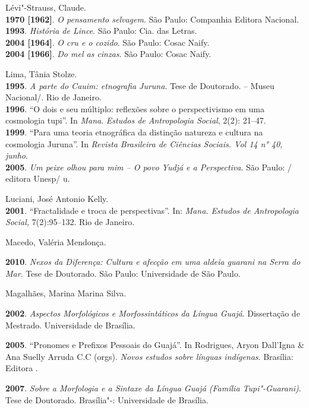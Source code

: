 \begin{Parskip}
Lévi"-Strauss, Claude.\\
\textbf{1970 {[}1962{]}}. \emph{O pensamento selvagem}. São Paulo:
Companhia Editora Nacional.\\
\textbf{1993}. \emph{História de Lince}. São Paulo: Cia. das Letras.\\
\textbf{2004 {[}1964{]}}. \emph{O cru e o cozido}. São Paulo: Cosac
Naify.\\
\textbf{2004 {[}1966{]}}. \emph{Do mel as cinzas}. São Paulo: Cosac
Naify.

Lima, Tânia Stolze.\\
\textbf{1995}. \emph{A parte do Cauim: etnografia Juruna}. Tese de
Doutorado.  -- Museu Nacional/. Rio de Janeiro.\\
\textbf{1996}. ``O dois e seu múltiplo: reflexões sobre o perspectivismo
em uma cosmologia tupi''. In \emph{Mana}. \emph{Estudos de Antropologia
Social}, 2(2): 21--47.\\
\textbf{1999}. ``Para uma teoria etnográfica da distinção natureza e
cultura na cosmologia Juruna''. In \emph{Revista Brasileira de Ciências
Sociais. Vol 14 n° 40, junho}.\\
\textbf{2005}. \emph{Um peixe olhou para mim -- O povo Yudjá e a
Perspectiva}. São Paulo: / editora Unesp/ u.

Luciani, José Antonio Kelly.\\
\textbf{2001}. ``Fractalidade e troca de perspectivas''. In: \emph{Mana.
Estudos de Antropologia Social,} 7(2):95--132. Rio de Janeiro.

Macedo, Valéria Mendonça.

\textbf{2010}. \emph{Nexos da Diferença: Cultura e afecção em uma aldeia
guarani na Serra do Mar}. Tese de Doutorado. São Paulo: Universidade de
São Paulo.

Magalhães, Marina Marina Silva.

\textbf{2002}. \emph{Aspectos Morfológicos e Morfossintáticos da Língua
Guajá}. Dissertação de Mestrado. Universidade de Brasília.

\textbf{2005}. ``Pronomes e Prefixos Pessoais do Guajá''. In Rodrigues,
Aryon Dall'Igna \& Ana Suelly Arruda C.C (orgs). \emph{Novos estudos
sobre línguas indígenas}. Brasília: Editora .

\textbf{2007}. \emph{Sobre a Morfologia e a Sintaxe da Língua Guajá
(Família Tupi"-Guarani)}. Tese de Doutorado. Brasília"-: Universidade de
Brasília.


\end{Parskip}
